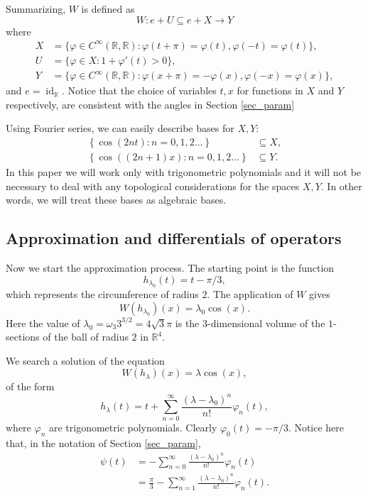 \documentclass{amsart}
\def \R{\mathbb R}
\def \id{\operatorname{id}}
\begin{document}
Summarizing, $W$ is defined as
\[W: e + U \subseteq e + X \to Y\]
where
\begin{align}
	X &= \{\varphi \in C^\infty(\R,\R) : \varphi(t+\pi) = \varphi(t), \varphi(-t) = \varphi(t)\},\\
	U &= \{\varphi \in X: 1+\varphi'(t) > 0\},\\
	Y &= \{\varphi \in C^\infty(\R,\R) : \varphi(x+\pi) = -\varphi(x), \varphi(-x) = \varphi(x)\},
\end{align}
and $e = \id_\R$.
Notice that the choice of variables $t,x$ for functions in $X$ and $Y$ respectively, are consistent with the angles in Section \ref{sec_param}

Using Fourier series, we can easily describe bases for $X,Y$:
\begin{align}
	\left\{ \cos(2 n t): n = 0, 1, 2 \ldots \right\} & \subseteq X,\\
	\left\{ \cos((2n+1) x): n = 0, 1, 2 \ldots \right\} & \subseteq Y.
\end{align}
In this paper we will work only with trigonometric polynomials and it will not be necessary to deal with any topological considerations for the spaces $X,Y$.
In other words, we will treat these bases as algebraic bases.

\subsection{Approximation and differentials of operators}
Now we start the approximation process.
The starting point is the function
\[h_{\lambda_0}(t) = t-\pi/3,\]
which represents the circumference of radius $2$.
The application of $W$ gives
\[W(h_{\lambda_0})(x) = \lambda_0 \cos(x).\]
Here the value of $\lambda_0 = \omega_3 3^{3/2} = 4 \sqrt{3}\pi$ is the $3$-dimensional volume of the $1$-sections of the ball of radius $2$ in $\R^4$.

We search a solution of the equation
\begin{equation}
	W(h_\lambda)(x) = \lambda \cos(x),
\end{equation}
of the form
\[h_\lambda(t) = t+ \sum_{n=0}^\infty \frac {(\lambda-\lambda_0)^n}{n!} \varphi_n(t),\]
where $\varphi_n$ are trigonometric polynomials. Clearly $\varphi_0(t) = -\pi/3$.
Notice here that, in the notation of Section \ref{sec_param},
\begin{align}
\psi(t)
&= - \sum_{n=0}^\infty \frac {(\lambda-\lambda_0)^n}{n!} \varphi_n(t) \\
&= \frac \pi 3 - \sum_{n=1}^\infty \frac {(\lambda-\lambda_0)^n}{n!} \varphi_n(t).
\end{align}
\end{document}
